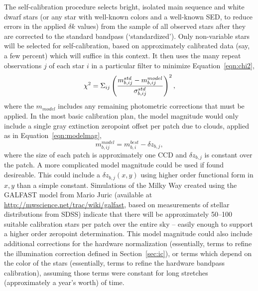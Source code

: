\documentclass[12pt,preprint]{aastex}
\begin{document}
The self-calibration procedure selects bright, isolated main sequence
and white dwarf stars (or any star with well-known colors and a
well-known SED, to reduce errors in the applied
$\delta k$ values) from the sample of all observed stars after they are
corrected to the standard bandpass (`standardized'). Only non-variable stars will be
selected for self-calibration, based on approximately calibrated data
(say, a few percent) which will suffice in this context. It then uses
the many repeat observations $j$ of each star $i$ in a particular
filter to minimize Equation~\ref{eqn:chi2},
\begin{equation}
\chi^2 = \Sigma_{ij} \left(  { m_{b,ij}^{std} - m_{b,ij}^{model} \over
    \sigma_{b,ij}^{std} } \right)^2, \nonumber
\end{equation}
where the $m_{model}$ includes any remaining photometric corrections
that must be applied. In the most basic calibration plan, the model
magnitude would only include a single gray extinction zeropoint offset
per patch due to clouds, applied as in Equation~\ref{eqn:modelmag},
\begin{equation}
m^{model}_{b,ij} = m^{best}_{b,i} - \delta z_{b,j}, \nonumber
\end{equation}
where the size of each patch is approximately one CCD and $\delta
z_{b,j}$ is constant over the patch. A more complicated model
magnitude could be used if found desireable. This could include a
$\delta z_{b,j}(x,y)$ using higher order functional form in $x,y$ than
a simple constant.  Simulations of the Milky Way created using the
GALFAST model from Mario Juric (available at
\url{http://mwscience.net/trac/wiki/galfast}, based on measurements of
stellar distributions from SDSS) indicate that there will be
approximately 50--100 suitable calibration stars per patch over the
entire sky -- easily enough to support a higher order zeropoint
determination.  This model magnitude could also include additional
corrections for the hardware normalization (essentially, terms to
refine the illumination correction defined in Section~\ref{sec:ic}),
or terms which depend on the color of the stars (essentially, terms to
refine the hardware bandpass calibration), assuming those terms were
constant for long stretches (approximately a year's worth) of time.
\end{document}
